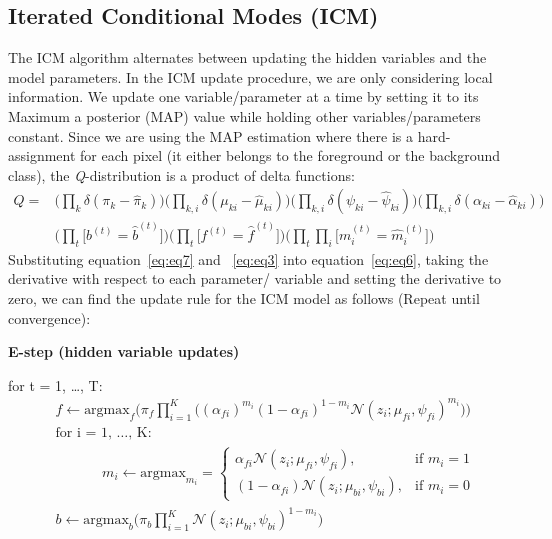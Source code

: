 \documentclass{article} %
\begin{document}
\subsection{Iterated Conditional Modes (ICM)}
\label{icm}
The ICM algorithm alternates between updating the hidden variables and the model parameters. In the ICM update procedure, we are only considering local information. We update one variable/parameter at a time by setting it to its Maximum a posterior (MAP) value while holding other variables/parameters constant. Since we are using the MAP estimation where there is a hard-assignment for each pixel (it either belongs to the foreground or the background class), the \textit{Q}-distribution is a product of delta functions:
\begin{equation} \label{eq:eq7}
\begin{split}
Q = &\Bigg( \prod_{k}\delta(\pi_k-\hat{\pi}_k) \Bigg) \Bigg( \prod_{k,i}\delta(\mu_{ki}-\hat{\mu}_{ki}) \Bigg)\Bigg( \prod_{k,i}\delta(\psi_{ki}-\hat{\psi}_{ki}) \Bigg)\Bigg( \prod_{k,i}\delta(\alpha_{ki}-\hat{\alpha}_{ki}) \Bigg) \\
&\Bigg( \prod_{t}\Big[b^{(t)} = \hat{b}^{(t)}\Big] \Bigg)\Bigg( \prod_{t}\Big[f^{(t)} = \hat{f}^{(t)}\Big] \Bigg)\Bigg( \prod_{t}\prod_{i}\Big[m_i^{(t)} = \hat{m}_i^{(t)}\Big] \Bigg)
\end{split}
\end{equation}
Substituting equation~\ref{eq:eq7} and ~\ref{eq:eq3} into equation~\ref{eq:eq6}, taking the derivative with respect to each parameter/ variable and setting the derivative to zero, we can find the update rule for the ICM model as follows (Repeat until convergence):

\textbf{E-step (hidden variable updates)}

for t = 1, \ldots , T:
\begin{align*} 
&f \leftarrow \text{argmax}_{f}\Bigg(\pi_f \prod_{i=1}^K\Big({(\alpha_{fi})}^{m_{i}} {(1-\alpha_{fi})}^{1-m_{i}}\mathcal{N}(z_i;\mu_{fi},\psi_{fi})^{m_{i}}\Big)\Bigg)\\
&\text{for i = 1, \ldots , K: } \\
& \text{ }\text{ }\text{ }\text{ }\text{ }m_i \leftarrow \text{argmax}_{m_i}=\begin{cases}
\alpha_{fi}\mathcal{N}(z_i;\mu_{fi},\psi_{fi}), & \text{if $m_i = 1$}\\
(1-\alpha_{fi})\mathcal{N}(z_i;\mu_{bi},\psi_{bi}), & \text{if $m_i = 0$}
\end{cases} \\
&b \leftarrow \text{argmax}_{b}\Bigg(\pi_b \prod_{i=1}^K \mathcal{N}(z_i;\mu_{bi},\psi_{bi})^{1-m_{i}}\Bigg)
\end{align*} 
\end{document}

